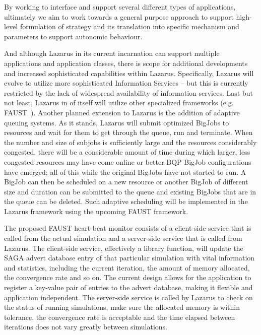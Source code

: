 \documentclass{sig-alternate}
\begin{document}
By working to interface and support several different types of
applications, ultimately we aim to work towards a general purpose
approach to support high-level formulation of strategy and its
translation into specific mechanism and parameters to support
autonomic behaviour.

And although Lazarus in its current incarnation can support multiple applications and application classes, there is scope for additional developments and increased sophisticated capabilities within Lazarus.  Specifically, Lazarus will evolve to utilize more sophisticated Information Services -- but this is currently restricted by the lack of widespread availability of information services. Last but not least, Lazarus in of itself will utilize other specialized frameworks (e.g. FAUST~\cite{faust_url}).  Another planned extension to Lazarus is the addition of adaptive queuing systems. As it stands, Lazarus will submit optimized BigJobs to resources and wait for them to get through the queue, run and terminate.  When the number and size of subjobs is sufficiently large and the resources considerably congested, there will be a considerable amount of time during which larger, less congested resources may have come online or better BQP BigJob configurations have emerged; all of this while the original BigJobs have not started to run. A BigJob can then be scheduled on a new resource or another BigJob of different size and duration can be submitted to the queue and existing BigJobs that are in the queue can be deleted.  Such adaptive scheduling will be implemented in the Lazarus framework using the upcoming FAUST framework.

The proposed FAUST heart-beat monitor consists of a client-side service that is called from the actual simulation and a server-side service that is called from Lazarus. The client-side service, effectively a library function, will update the SAGA advert database entry of that particular simulation with vital information and statistics, including the current iteration, the amount of memory allocated, the convergence rate and so on. The current design allows for the application to register a key-value pair of entries to the advert database, making it flexible and application independent. The server-side service is called by Lazarus to check on the status of running simulations, make sure the allocated memory is within tolerance, the convergence rate is acceptable and the time elapsed between iterations does not vary greatly between simulations. 

\end{document}
